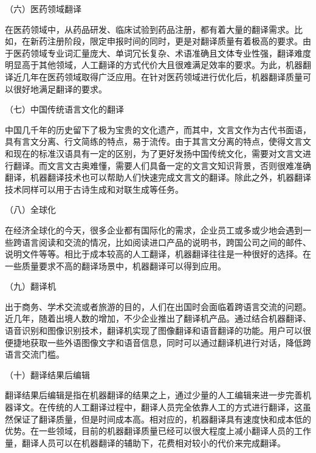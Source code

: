 \parinterval （六）医药领域翻译

\parinterval 在医药领域中，从药品研发、临床试验到药品注册，都有着大量的翻译需求。比如，在新药注册阶段，限定申报时间的同时，更是对翻译质量有着极高的要求。由于医药领域专业词汇量庞大、单词冗长复杂、术语准确且文体专业性强，翻译难度明显高于其他领域，人工翻译的方式代价大且很难满足效率的要求。为此，机器翻译近几年在医药领域取得广泛应用。在针对医药领域进行优化后，机器翻译质量可以很好地满足翻译的要求。

\parinterval （七）中国传统语言文化的翻译

\parinterval 中国几千年的历史留下了极为宝贵的文化遗产，而其中，文言文作为古代书面语，具有言文分离、行文简练的特点，易于流传。由于其言文分离的特点，使得文言文和现在的标准汉语具有一定的区别，为了更好发扬中国传统文化，需要对文言文进行翻译。而文言文古奥难懂，需要人们具备一定的文言文知识背景，否则很难准确翻译，机器翻译技术也可以帮助人们快速完成文言文的翻译。除此之外，机器翻译技术同样可以用于古诗生成和对联生成等任务。

\parinterval （八）全球化

\parinterval 在经济全球化的今天，很多企业都有国际化的需求，企业员工或多或少地会遇到一些跨语言阅读和交流的情况，比如阅读进口产品的说明书，跨国公司之间的邮件、说明文件等等。相比于成本较高的人工翻译，机器翻译往往是一种很好的选择。在一些质量要求不高的翻译场景中，机器翻译可以得到应用。

\parinterval （九）翻译机

\parinterval 出于商务、学术交流或者旅游的目的，人们在出国时会面临着跨语言交流的问题。近几年，随着出境人数的增加，不少企业推出了翻译机产品。通过结合机器翻译、语音识别和图像识别技术，翻译机实现了图像翻译和语音翻译的功能。用户可以很便捷地获取一些外语图像文字和语音信息，同时可以通过翻译机进行对话，降低跨语言交流门槛。

\parinterval （十）翻译结果后编辑

\parinterval 翻译结果后编辑是指在机器翻译的结果之上，通过少量的人工编辑来进一步完善机器译文。在传统的人工翻译过程中，翻译人员完全依靠人工的方式进行翻译，这虽然保证了翻译质量，但是时间成本高。相对应的，机器翻译具有速度快和成本低的优势。在一些领域，目前的机器翻译质量已经可以很大程度上减小翻译人员的工作量，翻译人员可以在机器翻译的辅助下，花费相对较小的代价来完成翻译。


\sectionnewpage
